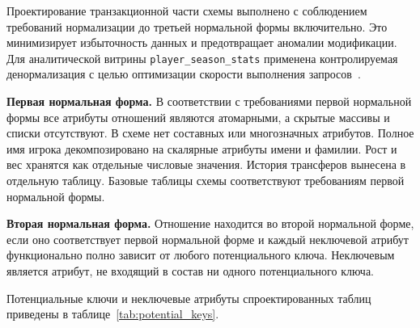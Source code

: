 Проектирование транзакционной части схемы выполнено с соблюдением требований нормализации до третьей нормальной формы включительно. Это минимизирует избыточность данных и предотвращает аномалии модификации. Для аналитической витрины \newline \texttt{player\_season\_stats} применена контролируемая денормализация с целью оптимизации скорости выполнения запросов~\cite{date}.

\textbf{Первая нормальная форма.} В соответствии с требованиями первой нормальной формы все атрибуты отношений являются атомарными, а скрытые массивы и списки отсутствуют. В схеме нет составных или многозначных атрибутов. Полное имя игрока декомпозировано на скалярные атрибуты имени и фамилии. Рост и вес хранятся как отдельные числовые значения. История трансферов вынесена в отдельную таблицу. Базовые таблицы схемы соответствуют требованиям первой нормальной формы.

\textbf{Вторая нормальная форма.} Отношение находится во второй нормальной форме, если оно соответствует первой нормальной форме и каждый неключевой атрибут функционально полно зависит от любого потенциального ключа. Неключевым является атрибут, не входящий в состав ни одного потенциального ключа.

Потенциальные ключи и неключевые атрибуты спроектированных таблиц приведены в таблице~\ref{tab:potential_keys}.

